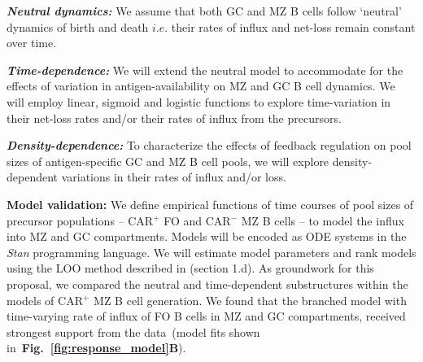 \documentclass[11pt]{article}
\newcommand\ie{$\textit{i.e.}$}
\begin{document}
%
\textbf{\textit{Neutral dynamics:}}
We assume that both GC and MZ B cells follow `neutral' dynamics of birth and death {\ie} their  rates of influx and net-loss remain constant over time. 

\textbf{\textit{Time-dependence:}}
We will extend the neutral model to accommodate for the effects of variation in antigen-availability on MZ and GC B cell dynamics.
We will employ linear, sigmoid and logistic functions to explore time-variation in their net-loss rates  and/or their rates of influx from the precursors.

\textbf{\textit{Density-dependence:}}
To characterize the effects of feedback regulation on pool sizes of antigen-specific GC and MZ B cell pools, we will explore density-dependent variations in their rates of influx and/or loss.


\textbf{{Model validation:}}
We define empirical functions of time courses of pool sizes of precursor populations -- CAR$^+$ FO and CAR$^-$ MZ B cells --  to model the influx into MZ and GC compartments.
Models will be encoded as ODE systems in the \textit{Stan} programming language.
We will estimate model parameters and rank models using the LOO method described in (section 1.d).
As groundwork for this proposal, we compared the neutral and time-dependent substructures within the models of CAR$^+$ MZ B cell generation.
We found that the branched model with time-varying rate of influx of FO B cells in MZ and GC compartments, received strongest support from the data~(model fits shown in~\textbf{Fig.~\ref{fig:response_model}B}).  
\end{document}
